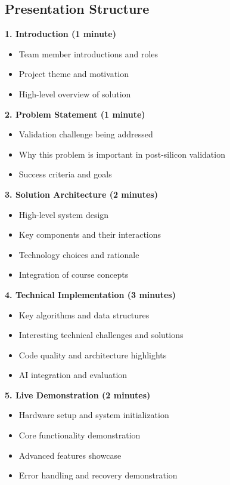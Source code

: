 \documentclass[11pt,a4paper]{article}
\begin{document}
\subsection{Presentation Structure}

\textbf{1. Introduction (1 minute)}
\begin{itemize}
    \item Team member introductions and roles
    \item Project theme and motivation
    \item High-level overview of solution
\end{itemize}

\textbf{2. Problem Statement (1 minute)}
\begin{itemize}
    \item Validation challenge being addressed
    \item Why this problem is important in post-silicon validation
    \item Success criteria and goals
\end{itemize}

\textbf{3. Solution Architecture (2 minutes)}
\begin{itemize}
    \item High-level system design
    \item Key components and their interactions
    \item Technology choices and rationale
    \item Integration of course concepts
\end{itemize}

\textbf{4. Technical Implementation (3 minutes)}
\begin{itemize}
    \item Key algorithms and data structures
    \item Interesting technical challenges and solutions
    \item Code quality and architecture highlights
    \item AI integration and evaluation
\end{itemize}

\textbf{5. Live Demonstration (2 minutes)}
\begin{itemize}
    \item Hardware setup and system initialization
    \item Core functionality demonstration
    \item Advanced features showcase
    \item Error handling and recovery demonstration
\end{itemize}
\end{document}

